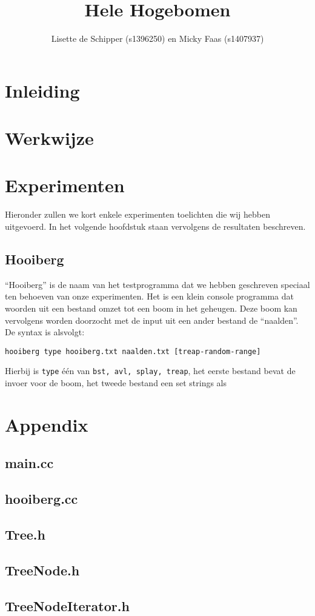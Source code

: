 \documentclass[a4paper,10pt]{article}
\title{ Hele Hogebomen }
\author{ Lisette de Schipper (s1396250) en Micky Faas (s1407937) }
\date{}
\begin{document}
\maketitle

\section*{Inleiding}


\section*{Werkwijze}

\section*{Experimenten}

Hieronder zullen we kort enkele experimenten toelichten die wij hebben uitgevoerd. In het volgende hoofdstuk staan vervolgens de resultaten beschreven.

\subsection*{Hooiberg}

``Hooiberg'' is de naam van het testprogramma dat we hebben geschreven speciaal ten behoeven van onze experimenten.
Het is een klein console programma dat woorden uit een bestand omzet tot een boom in het geheugen. 
Deze boom kan vervolgens worden doorzocht met de input uit een ander bestand de ``naalden''.
De syntax is alsvolgt:
\begin{verbatim}
hooiberg type hooiberg.txt naalden.txt [treap-random-range]
\end{verbatim}
Hierbij is \texttt{type} \'e\'en van \texttt{bst, avl, splay, treap}, het eerste bestand bevat de invoer voor de boom, het tweede bestand een set strings als 

\section*{Appendix}

\subsection*{main.cc}

\subsection*{hooiberg.cc}

\subsection*{Tree.h}

\subsection*{TreeNode.h}

\subsection*{TreeNodeIterator.h}

\end{document}
